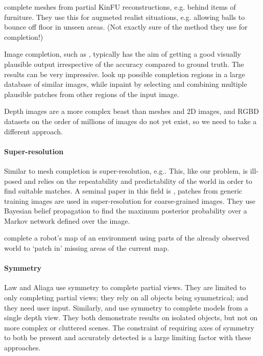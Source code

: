 \documentclass[10pt,a4paper, twocolumn]{article}
\makeatletter
\newcommand*{\eg}{e.g.\@\xspace}
\makeatother
\begin{document}
\cite{silberman-eccv-2014} complete meshes from partial KinFU reconstructions, \eg behind items of furniture.
They use this for augmeted realist situations, \eg allowing balls to bounce off floor in unseen areas.
(Not exactly sure of the method they use for completion!)

Image completion, such as \cite{hays-siggraph-2007, criminisi-cvpr-2003}, typically has the aim of getting a good visually plausible output irrespective of the accuracy compared to ground truth. 
The results can be very impressive. 
\cite{hays-siggraph-2007} look up possible completion regions in a large database of similar images, while \cite{criminisi-cvpr-2003} inpaint by selecting and combining multiple plausible patches from other regions of the input image.

Depth images are a more complex beast than meshes and 2D images, and RGBD datasets on the order of millions of images do not yet exist, so we need to take a different approach.

\paragraph{Super-resolution}
Similar to mesh completion is super-resolution, \eg \cite{macaodha-eccv-2012}. 
This, like our problem, is ill-posed and relies on the repeatability and predictability of the world in order to find suitable matches.
A seminal paper in this field is \cite{freeman-ijcv-2000}, patches from generic training images are used in super-resolution for coarse-grained images. They use Bayesian belief propagation to find the maximum posterior probability over a Markov network defined over the image.

\cite{chang-tor-2007} complete a robot's map of an environment using parts of the already observed world to  `patch in' missing areas of the current map.

\paragraph{Symmetry}
Law and Aliaga \cite{law-cviu-2010} use symmetry to complete partial views. 
They are limited to only completing partial views; they rely on all objects being symmetrical; and they need user input.
Similarly, \cite{thrun-iccv-2005} and \cite{kroemer-humanoids-2012} use symmetry to complete models from a single depth view. 
They both demonstrate results on isolated objects, but not on more complex or cluttered scenes. 
The constraint of requiring axes of symmetry to both be present and accurately detected is a large limiting factor with these approaches.
\end{document}

